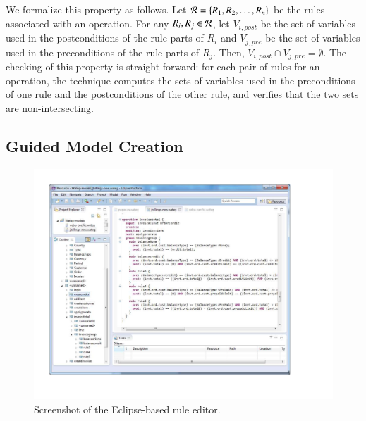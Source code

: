 We formalize this property as follows. Let ${\cal R} = \{R_1, R_2, \ldots,
R_n\}$ be the rules associated with an operation. For any $R_i, R_j \in {\cal
  R}$, let $V_{i, \mathit{post}}$ be the set of variables used in the
postconditions of the rule parts of $R_i$ and $V_{j, \mathit{pre}}$ be the set
of variables used in the preconditions of the rule parts of $R_j$. Then, $V_{i,
  \mathit{post}} \cap V_{j, \mathit{pre}} = \emptyset$. The checking of this
property is straight forward: for each pair of rules for an operation, the
technique computes the sets of variables used in the preconditions of one rule
and the postconditions of the other rule, and verifies that the two sets are
non-intersecting.

\subsection{Guided Model Creation}

\begin{figure}[t]
\centering
\includegraphics[trim=43 65 114 36,clip,width=\columnwidth]{figs/rule-editor.pdf}
\vspace*{-15pt}
\caption{Screenshot of the Eclipse-based rule editor.}
\vspace*{-12pt}
\label{fig:rule-editor}
\end{figure}

